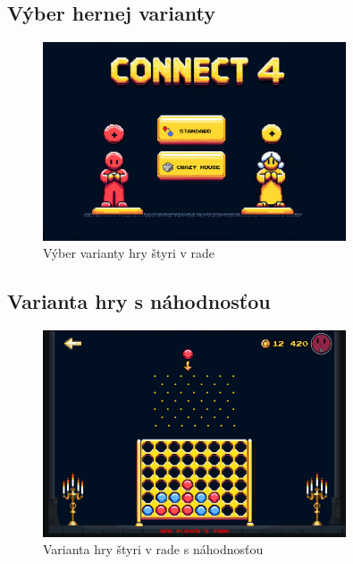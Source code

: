 \documentclass[a4paper, 11pt, onecolumn]{article}
\begin{document}
\subsection*{Výber hernej varianty}
\begin{figure}[H]
  \centering
  \includegraphics[width=0.8\textwidth]{PickVariant.png}
  \caption{Výber varianty hry štyri v rade}
  \label{fig:pick_variant}
\end{figure}

\subsection*{Varianta hry s náhodnosťou}
\begin{figure}[H]
  \centering
  \includegraphics[width=0.8\textwidth]{RandomVariant.png}
  \caption{Varianta hry štyri v rade s náhodnosťou}
  \label{fig:random_variant}
\end{figure}
\end{document}
